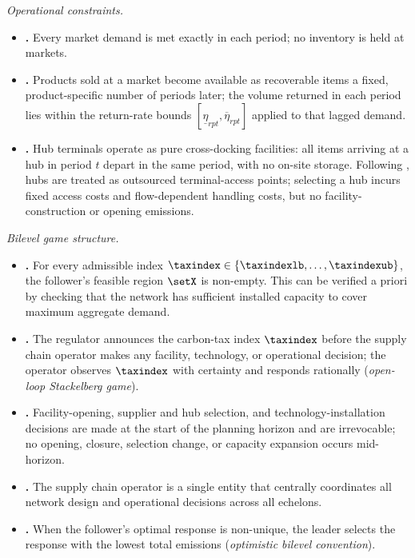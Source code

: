 \medskip
\noindent\textit{Operational constraints.}
\begin{itemize}[leftmargin=2.8em, label={}, itemsep=0.55em]
\item {}\label{as:dem}%
  \textbf{\theassumption.}\enspace
  Every market demand is met exactly in each period; no inventory is
  held at markets.
\item {}\label{as:retlag}%
  \textbf{\theassumption.}\enspace
  Products sold at a market become available as recoverable items a
  fixed, product-specific number of periods later; the volume returned
  in each period lies within the return-rate bounds
  $[\underline{\eta}_{rpt},\overline{\eta}_{rpt}]$ applied to that
  lagged demand.
\item {}\label{as:hub}%
  \textbf{\theassumption.}\enspace
  Hub terminals operate as pure cross-docking facilities: all items
  arriving at a hub in period $t$ depart in the same period, with no
  on-site storage. Following \citet{mota2018}, hubs are treated as
  outsourced terminal-access points; selecting a hub incurs fixed access
  costs and flow-dependent handling costs, but no facility-construction
  or opening emissions.
\end{itemize}

\medskip
\noindent\textit{Bilevel game structure.}
\begin{itemize}[leftmargin=2.8em, label={}, itemsep=0.55em]
\item {}\label{as:feas}%
  \textbf{\theassumption.}\enspace
  For every admissible index $\taxindex\in\{\taxindexlb,\ldots,\taxindexub\}$,
  the follower's feasible region $\setX$ is non-empty. This can be
  verified a priori by checking that the network has sufficient
  installed capacity to cover maximum aggregate demand.
\item {}\label{as:stackelberg}%
  \textbf{\theassumption.}\enspace
  The regulator announces the carbon-tax index $\taxindex$ before the
  supply chain operator makes any facility, technology, or operational
  decision; the operator observes $\taxindex$ with certainty and responds
  rationally (\emph{open-loop Stackelberg game}).
\item {}\label{as:fixednet}%
  \textbf{\theassumption.}\enspace
  Facility-opening, supplier and hub selection, and
  technology-installation decisions are made at the start of the
  planning horizon and are irrevocable; no opening, closure, selection
  change, or capacity expansion occurs mid-horizon.
\item {}\label{as:singleop}%
  \textbf{\theassumption.}\enspace
  The supply chain operator is a single entity that centrally
  coordinates all network design and operational decisions across all
  echelons.
\item {}\label{as:opt}%
  \textbf{\theassumption.}\enspace
  When the follower's optimal response is non-unique, the leader
  selects the response with the lowest total emissions
  (\emph{optimistic bilevel convention}).
\end{itemize}

